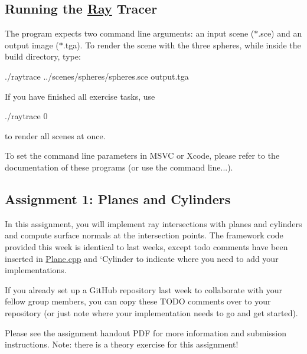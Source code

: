 \subsection*{Running the \hyperlink{classRay}{Ray} Tracer }

The program expects two command line arguments\+: an input scene ({\ttfamily $\ast$.sce}) and an output image ({\ttfamily $\ast$.tga}). To render the scene with the three spheres, while inside the {\ttfamily build} directory, type\+: \begin{DoxyVerb}./raytrace ../scenes/spheres/spheres.sce output.tga
\end{DoxyVerb}


If you have finished all exercise tasks, use \begin{DoxyVerb}./raytrace 0
\end{DoxyVerb}


to render all scenes at once.

To set the command line parameters in M\+S\+VC or Xcode, please refer to the documentation of these programs (or use the command line...).

\subsection*{Assignment 1\+: Planes and Cylinders }

In this assignment, you will implement ray intersections with planes and cylinders and compute surface normals at the intersection points. The framework code provided this week is identical to last week\textquotesingle{}s, except {\ttfamily todo} comments have been inserted in {\ttfamily \hyperlink{Plane_8cpp}{Plane.\+cpp}} and `\+Cylinder to indicate where you need to add your implementations.

If you already set up a Git\+Hub repository last week to collaborate with your fellow group members, you can copy these T\+O\+DO comments over to your repository (or just note where your implementation needs to go and get started).

Please see the assignment handout P\+DF for more information and submission instructions. Note\+: there is a theory exercise for this assignment! 